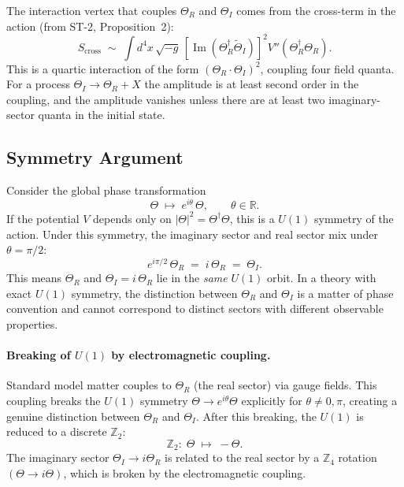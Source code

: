 \documentclass[12pt]{article}
\begin{document}
The interaction vertex that couples $\Theta_R$ and $\Theta_I$ comes
from the cross-term in the action (from ST-2, Proposition~2):
\begin{equation}
  S_\mathrm{cross}
  \;\sim\; \int d^4x\,\sqrt{-g}\,
  \left[\operatorname{Im}(\Theta_R^\dagger\widetilde\Theta_I)\right]^2
  V''(\Theta_R^\dagger\Theta_R).
\end{equation}
This is a quartic interaction of the form
$(\Theta_R \cdot \Theta_I)^2$, coupling four field quanta.
For a process $\Theta_I \to \Theta_R + X$ the amplitude is at
least second order in the coupling, and the amplitude vanishes unless
there are at least two imaginary-sector quanta in the initial state.

\subsection{Symmetry Argument}

Consider the global phase transformation
\begin{equation}
  \Theta \;\mapsto\; e^{i\theta}\,\Theta, \qquad \theta \in \mathbb{R}.
  \label{eq:u1_sym}
\end{equation}
If the potential $V$ depends only on $|\Theta|^2 = \Theta^\dagger\Theta$,
this is a $U(1)$ symmetry of the action.  Under this symmetry, the
imaginary sector and real sector mix under $\theta = \pi/2$:
\begin{equation}
  e^{i\pi/2}\,\Theta_R \;=\; i\,\Theta_R \;=\; \Theta_I.
\end{equation}
This means $\Theta_R$ and $\Theta_I = i\,\Theta_R$ lie in the
\emph{same} $U(1)$ orbit.  In a theory with exact $U(1)$ symmetry,
the distinction between $\Theta_R$ and $\Theta_I$ is a matter of
phase convention and cannot correspond to distinct sectors with
different observable properties.

\paragraph{Breaking of $U(1)$ by electromagnetic coupling.}
Standard model matter couples to $\Theta_R$ (the real sector) via
gauge fields.  This coupling breaks the $U(1)$ symmetry
$\Theta \to e^{i\theta}\Theta$ explicitly for $\theta \neq 0, \pi$,
creating a genuine distinction between $\Theta_R$ and $\Theta_I$.
After this breaking, the $U(1)$ is reduced to a discrete $\mathbb{Z}_2$:
\begin{equation}
  \mathbb{Z}_2:\;\Theta \;\mapsto\; -\Theta.
  \label{eq:z2}
\end{equation}
The imaginary sector $\Theta_I \to i\Theta_R$ is related to the
real sector by a $\mathbb{Z}_4$ rotation
$(\Theta \to i\Theta)$, which is broken by the electromagnetic
coupling.
\end{document}
